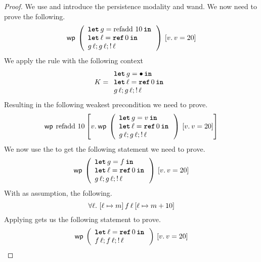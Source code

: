 \documentclass[thesis.tex]{subfiles}
\begin{document}
\begin{proof}
    We use  and introduce the persistence modality and wand. We now need to prove the following.
    \[\wpre{
            \left(
            \begin{array}{l}
                \Let g = \operatorname{refadd}\, 10 in \\
                \Let \loc = \Alloc 0 in                \\
                g\, \loc; g\, \loc; \deref \loc
            \end{array}
            \right)
        }{\Ret \val. \val = 20}\]
    We apply the  rule with the following context
    \[
        \lctx = \begin{array}{l}
            \Let g = \bullet in     \\
            \Let \loc = \Alloc 0 in \\
            g\, \loc; g\, \loc; \deref \loc
        \end{array}
    \]
    Resulting in the following weakest precondition we need to prove.
    \[
        \wpre{\operatorname{refadd}\, 10}{
            \Ret\val. \wpre{\left(\begin{array}{l}
                    \Let g = \val in        \\
                    \Let \loc = \Alloc 0 in \\
                    g\, \loc; g\, \loc; \deref \loc
                \end{array}\right)}{\Ret \val. \val = 20}
        }
    \]
    We now use the  to get the following statement we need to prove.
    \[
        \wpre{\left(\begin{array}{l}
                \Let g = f in           \\
                \Let \loc = \Alloc 0 in \\
                g\, \loc; g\, \loc; \deref \loc
            \end{array}\right)}{\Ret \val. \val = 20}
    \]
    With as assumption, the following.
    \[
        \forall \loc.\ \hoare{\loc \fmapsto m}{f\, \loc}{\loc\fmapsto m + 10}
    \]
    Applying  gets us the following statement to prove.
    \[
        \wpre{\left(\begin{array}{l}
                \Let \loc = \Alloc 0 in \\
                f\, \loc; f\, \loc; \deref \loc
            \end{array}\right)}{\Ret \val. \val = 20}
\]
\end{proof}
\end{document}
